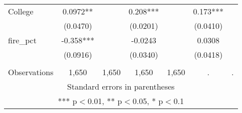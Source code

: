 \begin{tabular}{lcccccc}
College & 0.0972** &  & 0.208*** &  & 0.173*** &  \\
 & (0.0470) &  & (0.0201) &  & (0.0410) &  \\
fire\_pct & -0.358*** &  & -0.0243 &  & 0.0308 &  \\
 & (0.0916) &  & (0.0340) &  & (0.0418) &  \\
 &  &  &  &  &  &  \\
 Observations & 1,650 & 1,650 & 1,650 & 1,650 & . & . \\ \hline
\multicolumn{7}{c}{ Standard errors in parentheses} \\
\multicolumn{7}{c}{ *** p$<$0.01, ** p$<$0.05, * p$<$0.1} \\
\end{tabular}
